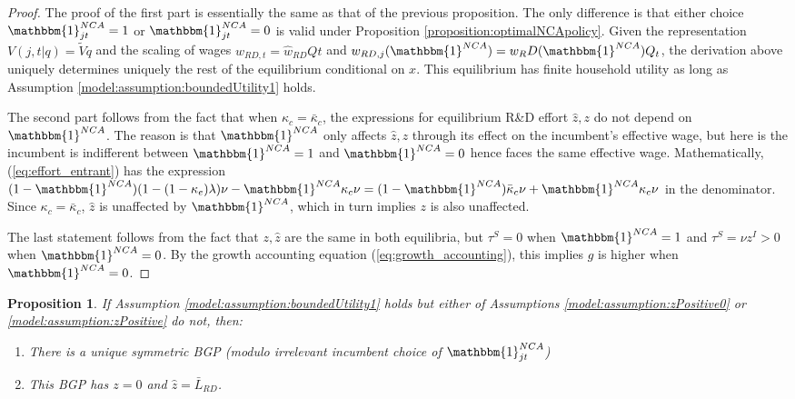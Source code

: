 \documentclass[11pt,english]{article}
\newtheorem{proposition}{Proposition}
\begin{document}
\begin{proof}
	The proof of the first part is essentially the same as that of the previous proposition. The only difference is that either choice $\mathbbm{1}^{NCA}_{jt} = 1$ or $\mathbbm{1}^{NCA}_{jt} = 0$ is valid under Proposition \ref{proposition:optimalNCApolicy}. Given the representation $V(j,t|q) = \tilde{V}q$ and the scaling of wages $\hat{w}_{RD,t} = \hat{w}_{RD}Qt$ and $w_{RD,j}(\mathbbm{1}^{NCA}) = w_RD(\mathbbm{1}^{NCA}) Q_t$, the derivation above uniquely determines uniquely the rest of the equilibrium conditional on $x$. This equilibrium has finite household utility as long as Assumption \ref{model:assumption:boundedUtility1} holds. 
	
	The second part follows from the fact that when $\kappa_c = \bar{\kappa}_c$, the expressions for equilibrium R\&D effort $\hat{z},z$ do not depend on $\mathbbm{1}^{NCA}$. The reason is that $\mathbbm{1}^{NCA}$ only affects $\hat{z},z$ through its effect on the incumbent's effective wage, but here is the incumbent is indifferent between $\mathbbm{1}^{NCA} = 1$ and $\mathbbm{1}^{NCA} = 0$ hence faces the same effective wage. Mathematically, (\ref{eq:effort_entrant}) has the expression $(1-\mathbbm{1}^{NCA})(1-(1-\kappa_e)\lambda)\nu - \mathbbm{1}^{NCA} \kappa_c \nu = (1-\mathbbm{1}^{NCA}) \bar{\kappa}_c \nu + \mathbbm{1}^{NCA} \kappa_c \nu$ in the denominator. Since $\kappa_c = \bar{\kappa}_c$, $\hat{z}$ is unaffected by $\mathbbm{1}^{NCA}$, which in turn implies $z$ is also unaffected.
	
	The last statement follows from the fact that $z,\hat{z}$ are the same in both equilibria, but $\tau^S = 0$ when $\mathbbm{1}^{NCA} = 1$ and $\tau^S = \nu z^I > 0$ when $\mathbbm{1}^{NCA} = 0$. By the growth accounting equation (\ref{eq:growth_accounting}), this implies $g$ is higher when $\mathbbm{1}^{NCA} = 0$. 
\end{proof}

\begin{proposition}\label{proposition:purstrategyeq:zeroOI}
	If Assumption \ref{model:assumption:boundedUtility1} holds but either of Assumptions \ref{model:assumption:zPositive0} or \ref{model:assumption:zPositive} do not, then:
	\begin{enumerate}
		\item There is a unique symmetric BGP (modulo irrelevant incumbent choice of $\mathbbm{1}^{NCA}_{jt}$)
		\item This BGP has $z = 0$ and $\hat{z} = \bar{L}_{RD}$.
	\end{enumerate} 
\end{proposition}
\end{document}
